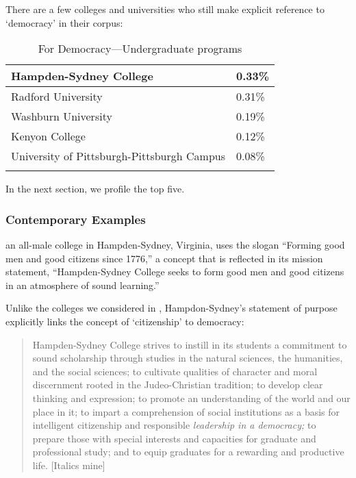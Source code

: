 There are a few colleges and universities who still make explicit reference to `democracy' in their corpus:

 \begin{longtable}[!t]{ | p{10cm} | R{2.5cm} |   }
\hline 

Hampden-Sydney College&0.33\%\\ \hline
Radford University&0.31\%\\ \hline
Washburn University&0.19\%\\ \hline
Kenyon College&0.12\%\\ \hline
University of Pittsburgh-Pittsburgh Campus&0.08\%\\ \hline

             \caption{For Democracy---Undergraduate programs}
\label{table: forDemoUndergraduate}
\end{longtable}

In the next section, we profile the top five.

\subsubsection{Contemporary Examples}
\label{contemporaryexamples}

 an all-male college in Hampden-Sydney, Virginia, uses the slogan ``Forming good men and good citizens since 1776,'' a concept that is reflected in its mission statement, ``Hampden-Sydney College seeks to form good men and good citizens in an atmosphere of sound learning.''

Unlike the colleges we considered in , Hampdon-Sydney's statement of purpose explicitly links the concept of `citizenship' to democracy:

\begin{quote}

Hampden-Sydney College strives to instill in its students a commitment to sound scholarship through studies in the natural sciences, the humanities, and the social sciences; to cultivate qualities of character and moral discernment rooted in the Judeo-Christian tradition; to develop clear thinking and expression; to promote an understanding of the world and our place in it; to impart a comprehension of social institutions as a basis for intelligent citizenship and responsible \emph{leadership in a democracy;} to prepare those with special interests and capacities for graduate and professional study; and to equip graduates for a rewarding and productive life. [Italics mine]
\end{quote}

